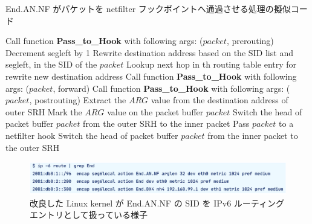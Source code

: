   \begin{algorithm*}[t]
    \caption{End.AN.NF がパケットを netfilter フックポイントへ通過させる処理の擬似コード}
    \small
    \label{alg:end-an-nf}
    \begin{algorithmic}[1]
      \State Call function \textbf{Pass\_to\_Hook} with following args: ($packet$, prerouting)
      \State Decrement segleft by 1
      \State Rewrite destination address based on the SID list and segleft, in the SID of the $packet$
      \State Lookup next hop in th routing table entry for rewrite new destination address
      \State Call function \textbf{Pass\_to\_Hook} with following args: ($packet$, forward)
      \State Call function \textbf{Pass\_to\_Hook} with following args: ($packet$, postrouting)
      \EndFunction
      \fi
      \State Extract the $ARG$ value from the destination address of outer SRH
      \State Mark the $ARG$ value on the packet buffer $packet$
      \EndIf
      \State Switch the head of packet buffer $packet$ from the outer SRH to the inner packet
      \State Pass $packet$ to a netfilter hook
      \State Switch the head of packet buffer $packet$ from the inner packet to the outer SRH
      \EndFunction
    \end{algorithmic}
  \end{algorithm*}
  
  \begin{figure}[t]
    \centering
    \includegraphics[width=0.95\linewidth]{img/End-FW-show-route.pdf}
    \caption{改良した Linux kernel が End.AN.NF の SID を IPv6 ルーティングエントリとして扱っている様子}
    \label{fig:show-route}
  \end{figure}

